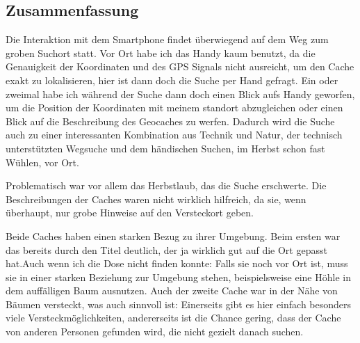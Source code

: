 \subsection*{Zusammenfassung}
Die Interaktion mit dem Smartphone findet überwiegend auf dem Weg zum groben Suchort statt. Vor Ort habe ich das Handy kaum benutzt, da die Genauigkeit der Koordinaten und des GPS Signals nicht ausreicht, um den Cache exakt zu lokalisieren, hier ist dann doch die Suche per Hand gefragt. Ein oder zweimal habe ich während der Suche dann doch einen Blick aufs Handy geworfen, um die Position der Koordinaten mit meinem standort abzugleichen oder einen Blick auf die Beschreibung des Geocaches zu werfen. Dadurch wird die Suche auch zu einer interessanten Kombination aus Technik und Natur, der technisch unterstützten Wegsuche und dem händischen Suchen, im Herbst schon fast Wühlen, vor Ort.

Problematisch war vor allem das Herbstlaub, das die Suche erschwerte. Die Beschreibungen der Caches waren nicht wirklich hilfreich, da sie, wenn überhaupt, nur grobe Hinweise auf den Versteckort geben.

Beide Caches haben einen starken Bezug zu ihrer Umgebung. Beim ersten war das bereits durch den Titel deutlich, der ja wirklich gut auf die Ort gepasst hat.Auch wenn ich die Dose nicht finden konnte: Falls sie noch vor Ort ist, muss sie in einer starken Beziehung zur Umgebung stehen, beispielsweise eine Höhle in dem auffälligen Baum ausnutzen. Auch der zweite Cache war in der Nähe von Bäumen versteckt, was auch sinnvoll ist: Einerseits gibt es hier einfach besonders viele Versteckmöglichkeiten, andererseits ist die Chance gering, dass der Cache von anderen Personen gefunden wird, die nicht gezielt danach suchen.